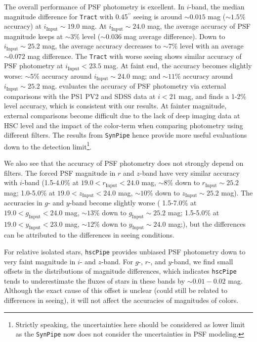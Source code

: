 \documentclass[useamsfonts]{pasj01}
\def\asec{$^{\prime\prime}$}
\def\hscpipe{\texttt{hscPipe}}
\def\synpipe{\texttt{SynPipe}}
\def\tract{\texttt{Tract}}
\begin{document}
    The overall performance of PSF photometry is excellent.
    In $i$-band, the median magnitude difference for \tract{} with 0.45\asec{} seeing is
    around ${\sim}0.015$ mag (${\sim}1.5$\% accuracy) at
    $i_{\mathrm{Input}}{\sim}19.0$ mag.
    At $i_{\mathrm{Input}}{\sim}24.0$ mag, the average accuracy of PSF
    magnitude keeps at ${\sim}3$\% level (${\sim}0.036$ mag average difference).
    Down to $i_{\mathrm{Input}}{\sim}25.2$ mag, the average accuracy decreases to
    ${\sim}7$\% level with an average ${\sim}0.072$ mag difference.
    The \tract{} with worse seeing shows similar accuracy of PSF photometry at
    $i_{\mathrm{Input}}<23.5$ mag.
    At faint end, the accuracy becomes slightly worse: ${\sim}5$\% accuracy around
    $i_{\mathrm{Input}}{\sim}24.0$ mag; and ${\sim}11$\% accuracy around
    $i_{\mathrm{Input}}{\sim}25.2$ mag.
    \citet{HSCDR1} evaluates the accuracy of PSF photometry via external comparisons
    with the PS1 PV2 and SDSS data at $i<21$ mag, and finds a 1-2\% level accuracy,
    which is consistent with our results.
    At fainter magnitude, external comparisons become difficult due to the lack of deep
    imaging data at HSC level and the impact of the color-term when comparing photometry
    using different filters.
    The results from \synpipe{} hence provide more useful evaluations down to the
    detection limit\footnote{Strictly speaking, the uncertainties here should be
    considered as lower limit as the \synpipe{} now does not consider the uncertainties
    in PSF modeling.}.

    We also see that the accuracy of PSF photometry does not strongly depend on filters.
    The forced PSF magnitude in $r$ and $z$-band have very similar accuracy with
    $i$-band (1.5-4.0\% at $19.0 < r_{\mathrm{Input}} < 24.0$ mag, ${\sim}8$\% down to
    $r_{\mathrm{Input}}{\sim}25.2$ mag;
    1.0-5.0\% at $19.0 < z_{\mathrm{Input}} < 24.0$ mag, ${\sim}10$\% down to
    $z_{\mathrm{Input}}{\sim}25.2$ mag).
    The accuracies in $g$- and $y$-band become slightly worse (
    1.5-7.0\% at $19.0 < g_{\mathrm{Input}} < 24.0$ mag, ${\sim}13$\% down to
    $g_{\mathrm{Input}}{\sim}25.2$ mag;
    1.5-5.0\% at $19.0 < y_{\mathrm{Input}} < 23.0$ mag, ${\sim}12$\% down to
    $y_{\mathrm{Input}}{\sim}24.0$ mag;), but the differences can be attributed to the
    differences in seeing conditions.

    For relative isolated stars, \hscpipe{} provides unbiased PSF photometry down to
    very faint magnitude in $i$- and $z$-band.
    For $g$-, $r$-, and $y$-band, we find small offsets in the distributions of magnitude
    differences, which indicates \hscpipe{} tends to underestimate the fluxes of stars
    in these bands by ${\sim}0.01-0.02$ mag.
    Although the exact cause of this offset is unclear (could still be related to
    differences in seeing), it will not affect the accuracies of magnitudes of colors.
\end{document}
